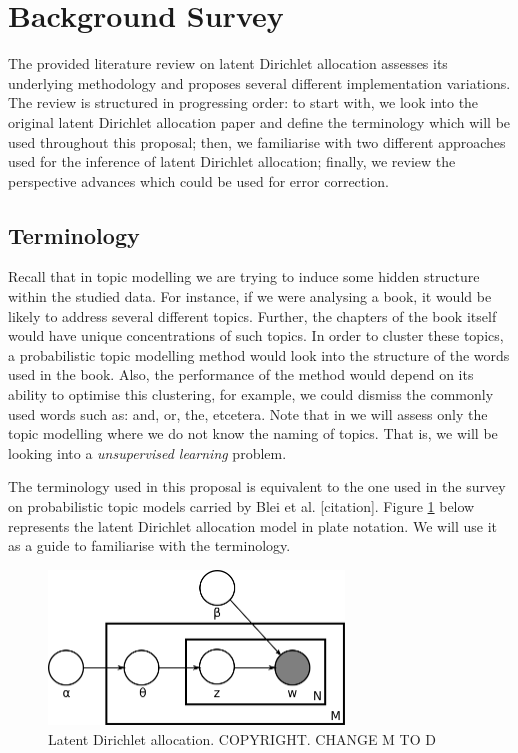 \documentclass{mprop}
\begin{document}
\section{Background Survey}

\par The provided literature review on latent Dirichlet allocation assesses its underlying methodology and proposes several different implementation variations. The review is structured in progressing order: to start with, we look into the original latent Dirichlet allocation paper and define the terminology which will be used throughout this proposal; then, we familiarise with two different approaches used for the inference of latent Dirichlet allocation;  finally, we review the perspective advances which could be used for error correction.

\subsection{Terminology}

\par Recall that in topic modelling we are trying to induce some hidden structure within the studied data. For instance, if we were analysing a book, it would be likely to address several different topics. Further, the chapters of the book itself would have unique concentrations of such topics. In order to cluster these topics, a probabilistic topic modelling method would look into the structure of the words used in the book. Also, the performance of the method would depend on its ability to optimise this clustering, for example, we could dismiss the commonly used words such as: and, or, the, etcetera. Note that in we will assess only the topic modelling where we do not know the naming of topics. That is, we will be looking into a \textit{unsupervised learning} problem.

\par The terminology used in this proposal is equivalent to the one used in the survey on probabilistic topic models carried by Blei et al. [citation]. Figure \ref{fig:lda} below represents the latent Dirichlet allocation model in plate notation. We will use it as a guide to familiarise with the terminology.   
\begin{figure}[H]
  \centering
  \includegraphics[width=0.7\textwidth]{lda}
  \caption{Latent Dirichlet allocation. COPYRIGHT. CHANGE M TO D}
  \label{fig:lda}
\end{figure}
\end{document}
